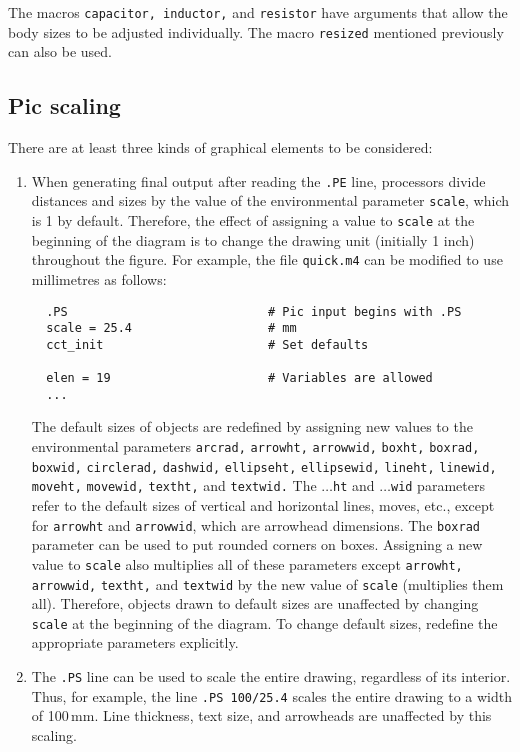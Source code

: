 The macros {\tt capacitor, inductor,} and {\tt resistor} have arguments
that allow the body sizes to be adjusted individually.  The macro
{\tt resized} mentioned previously can also be used.

\subsection{Pic scaling\label{Picscaling:}}
There are at least three kinds of graphical elements to be considered:
\begin{enumerate}
\item When generating final output after reading the {\tt.PE} line,
  \pic processors divide distances and sizes by the value of the
  environmental parameter {\tt scale}, which is 1 by default.  Therefore,
  the effect of assigning a value to {\tt scale} at the beginning of the
  diagram is to change the drawing unit (initially 1 inch) throughout
  the figure.  For example, the file {\tt quick.m4} can be modified to
  use millimetres as follows:
  \begin{verbatim}
  .PS                            # Pic input begins with .PS
  scale = 25.4                   # mm
  cct_init                       # Set defaults

  elen = 19                      # Variables are allowed
  ...
  \end{verbatim}
\vspace*{-1.5\baselineskip}
  The default sizes of \pic objects
  are redefined by assigning new values to the environmental parameters
  {\tt arcrad,} {\tt arrowht,} {\tt arrowwid,} {\tt boxht,} {\tt boxrad,}
  {\tt boxwid,} {\tt circlerad,} {\tt dashwid,} {\tt ellipseht,}
  {\tt ellipsewid,} {\tt lineht,} {\tt linewid,} {\tt moveht,}
  {\tt movewid,}
  {\tt textht,} and {\tt textwid.}
  The $\ldots${\tt ht} and $\ldots${\tt wid} parameters refer to the
  default sizes of vertical and horizontal lines, moves, etc., except for
  {\tt arrowht} and {\tt arrowwid}, which are arrowhead dimensions.
  The {\tt boxrad} parameter can be used to put rounded corners on boxes.
  Assigning a new value to {\tt scale} also multiplies all of these 
  parameters except {\tt arrowht,} {\tt arrowwid,} {\tt textht,} and
  {\tt textwid} by the new value of {\tt scale} (\gpic multiplies them all).
  Therefore, objects drawn to default sizes are unaffected by changing
  {\tt scale} at the beginning of the diagram.
  To change default sizes, redefine the appropriate parameters explicitly.

\item The {\tt .PS} line can be used to scale the entire drawing, regardless
  of its interior.  Thus, for example, the line {\tt.PS 100/25.4}
  scales the entire drawing to a width of 100$\,$mm.
  Line thickness, text size, and \dpic arrowheads are unaffected by
  this scaling.


\end{enumerate}
